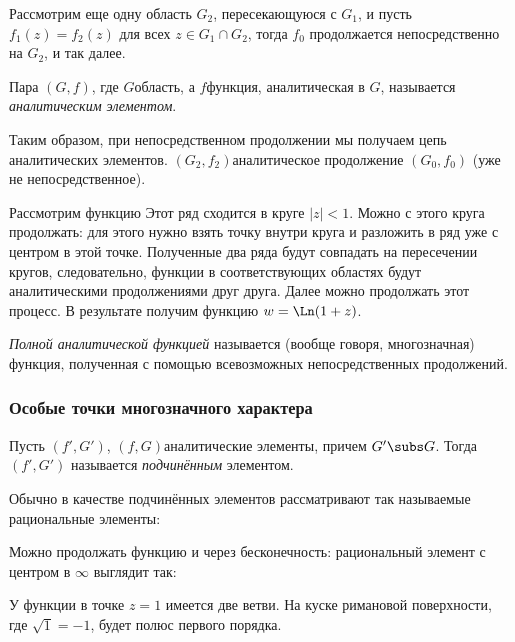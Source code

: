\documentclass[a4paper]{article}
\begin{document}
\begin{theorem}
Рассмотрим  еще одну область $G_2$, пересекающуюся с $G_1$, и пусть $f_1(z)=f_2(z)$ для всех $z \in G_1\cap G_2$,
тогда $f_0$ продолжается непосредственно на $G_2$, и так далее.

\begin{df}
Пара $(G, f)$, где $G$\т область, а $f$\т функция, аналитическая в $G$, называется \emph{аналитическим элементом}.
\end{df}

Таким образом, при непосредственном продолжении мы получаем цепь аналитических элементов.
$(G_2, f_2)$\т аналитическое продолжение $(G_0, f_0)$ (уже не непосредственное).


\begin{ex}
Рассмотрим функцию 
Этот ряд сходится в круге $|z|<1$. Можно с этого круга продолжать: для этого нужно взять точку внутри круга
и разложить в ряд уже с центром в этой точке. Полученные два ряда будут совпадать на пересечении кругов,
следовательно, функции в соответствующих областях будут аналитическими продолжениями друг друга. Далее можно
продолжать этот процесс. В результате получим функцию $w=\Ln(1+z)$.
\end{ex}

\begin{df}
\emph{Полной аналитической функцией} называется (вообще говоря, многозначная) функция, полученная с помощью всевозможных
непосредственных продолжений.
\end{df}

\subsubsection{Особые точки многозначного характера}

\begin{df} Пусть $(f', G')$, $(f, G)$\т аналитические элементы, причем $G' \subs G$. Тогда $(f', G')$
называется \emph{подчинённым} элементом.
\end{df}

Обычно в качестве подчинённых элементов рассматривают так называемые рациональные элементы:

Можно продолжать функцию и через бесконечность: рациональный элемент с центром в $\infty$ выглядит так:

\begin{ex}
У функции
в точке $z=1$ имеется две ветви. На куске римановой поверхности, где $\sqrt{1}=-1$,
будет полюс первого порядка.
\end{ex}


\end{theorem}
\end{document}
